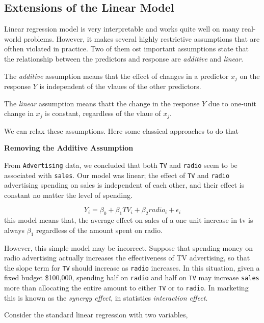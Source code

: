 \documentclass[
  letterpaper,
  DIV=11,
  numbers=noendperiod]{scrreprt}
\begin{document}
\hypertarget{extensions-of-the-linear-model}{%
\subsection{Extensions of the Linear
Model}\label{extensions-of-the-linear-model}}

Linear regression model is very interpretable and works quite well on
many real-world problems. However, it makes several highly restrictive
assumptions that are ofthen violated in practice. Two of them ost
important assumptions state that the relationship between the predictors
and response are \emph{additive} and \emph{linear}.

The \emph{additive} assumption means that the effect of changes in a
predictor \(x_j\) on the response \(Y\) is independent of the vlaues of
the other predictors.

The \emph{linear} assumption means thatt the change in the response
\(Y\) due to one-unit change in \(x_j\) is constant, regardless of the
vlaue of \(x_j\).

We can relax these assumptions. Here some classical approaches to do
that

\textbf{Removing the Additive Assumption}

From \texttt{Advertising} data, we concluded that both \texttt{TV} and
\texttt{radio} seem to be associated with \texttt{sales}. Our model was
linear; the effect of \texttt{TV} and \texttt{radio} advertising
spending on sales is independent of each other, and their effect is
constant no matter the level of spending.

\[
Y_i = \beta_0 + \beta_1 TV_i + \beta_2 radio_i + \epsilon_i
\] this model means that, the average effect on sales of a one unit
increase in tv is always \(\beta_1\) regardless of the amount spent on
radio.

However, this simple model may be incorrect. Suppose that spending money
on radio advertising actually increases the effectiveness of TV
advertising, so that the slope term for \texttt{TV} should increase as
\texttt{radio} increases. In this situation, given a fixed budget
\$100,000, spending half on \texttt{radio} and half on \texttt{TV} may
increase \texttt{sales} more than allocating the entire amount to either
\texttt{TV} or to \texttt{radio}. In marketing this is known as the
\emph{synergy effect}, in statistics \emph{interaction effect}.

Consider the standard linear regression with two variables,
\end{document}
